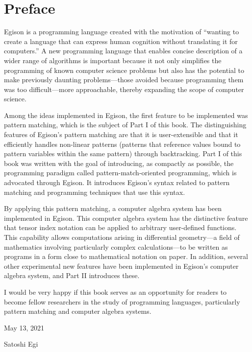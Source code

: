 \chapter*{Preface} 

Egison is a programming language created with the motivation of ``wanting to create a language that can express human cognition without translating it for computers.''
A new programming language that enables concise description of a wider range of algorithms is important because it not only simplifies the programming of known computer science problems but also has the potential to make previously daunting problems---those avoided because programming them was too difficult---more approachable, thereby expanding the scope of computer science.

Among the ideas implemented in Egison, the first feature to be implemented was pattern matching, which is the subject of Part I of this book.
The distinguishing features of Egison's pattern matching are that it is user-extensible and that it efficiently handles non-linear patterns (patterns that reference values bound to pattern variables within the same pattern) through backtracking.
Part I of this book was written with the goal of introducing, as compactly as possible, the programming paradigm called pattern-match-oriented programming, which is advocated through Egison.
It introduces Egison's syntax related to pattern matching and programming techniques that use this syntax.

By applying this pattern matching, a computer algebra system has been implemented in Egison.
This computer algebra system has the distinctive feature that tensor index notation can be applied to arbitrary user-defined functions.
This capability allows computations arising in differential geometry---a field of mathematics involving particularly complex calculations---to be written as programs in a form close to mathematical notation on paper.
In addition, several other experimental new features have been implemented in Egison's computer algebra system, and Part II introduces these.

I would be very happy if this book serves as an opportunity for readers to become fellow researchers in the study of programming languages, particularly pattern matching and computer algebra systems.

\begin{flushright}
  May 13, 2021
  
  Satoshi Egi
\end{flushright}
